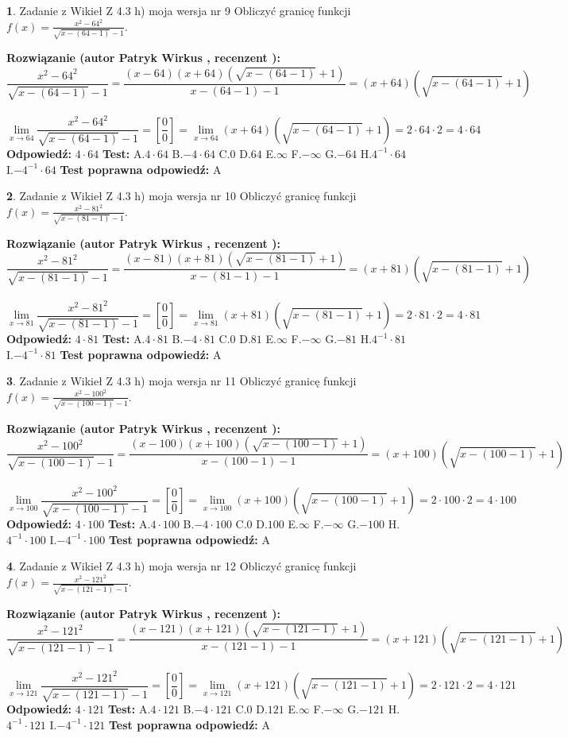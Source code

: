 \documentclass[12pt, a4paper]{article}
\theoremstyle{definition} %
\newtheorem{zad}{}
\newcommand{\zadStart}[1]{\begin{zad}#1\newline}
\newcommand{\zadStop}{\end{zad}}
\newcommand{\rozwStart}[2]{\noindent \textbf{Rozwiązanie (autor #1 , recenzent #2): }\newline}
\newcommand{\rozwStop}{\newline}
\newcommand{\odpStart}{\noindent \textbf{Odpowiedź:}\newline}
\newcommand{\odpStop}{\newline}
\newcommand{\testStart}{\noindent \textbf{Test:}\newline}
\newcommand{\testStop}{\newline}
\newcommand{\kluczStart}{\noindent \textbf{Test poprawna odpowiedź:}\newline}
\newcommand{\kluczStop}{\newline}
\begin{document}
\zadStart{Zadanie z Wikieł Z 4.3 h) moja wersja nr 9}
Obliczyć granicę funkcji $f(x)=\frac{x^{2} - 64^{2}}{\sqrt{x-(64-1)}-1}$.
\zadStop
\rozwStart{Patryk Wirkus}{}
$$\frac{x^{2} - 64^{2}}{\sqrt{x-(64-1)}-1}=\frac{(x-64)(x+64)(\sqrt{x-(64-1)}+1)}{x-(64-1)-1}=(x+64)(\sqrt{x-(64-1)}+1)$$
\\
$$\lim\limits_{x\to 64}\frac{x^{2} - 64^{2}}{\sqrt{x-(64-1)}-1}=[\frac{0}{0}]=
\lim\limits_{x\to 64}(x+64)(\sqrt{x-(64-1)}+1) = 2\cdot64 \cdot 2 = 4 \cdot 64$$
\rozwStop
\odpStart
$4\cdot64$
\odpStop
\testStart
A.$4\cdot64$
B.$-4\cdot64$
C.$0$
D.$64$
E.$\infty$
F.$-\infty$
G.$-64$
H.$4^{-1}\cdot64$
I.$-4^{-1}\cdot64$
\testStop
\kluczStart
A
\kluczStop



\zadStart{Zadanie z Wikieł Z 4.3 h) moja wersja nr 10}
Obliczyć granicę funkcji $f(x)=\frac{x^{2} - 81^{2}}{\sqrt{x-(81-1)}-1}$.
\zadStop
\rozwStart{Patryk Wirkus}{}
$$\frac{x^{2} - 81^{2}}{\sqrt{x-(81-1)}-1}=\frac{(x-81)(x+81)(\sqrt{x-(81-1)}+1)}{x-(81-1)-1}=(x+81)(\sqrt{x-(81-1)}+1)$$
\\
$$\lim\limits_{x\to 81}\frac{x^{2} - 81^{2}}{\sqrt{x-(81-1)}-1}=[\frac{0}{0}]=
\lim\limits_{x\to 81}(x+81)(\sqrt{x-(81-1)}+1) = 2\cdot81 \cdot 2 = 4 \cdot 81$$
\rozwStop
\odpStart
$4\cdot81$
\odpStop
\testStart
A.$4\cdot81$
B.$-4\cdot81$
C.$0$
D.$81$
E.$\infty$
F.$-\infty$
G.$-81$
H.$4^{-1}\cdot81$
I.$-4^{-1}\cdot81$
\testStop
\kluczStart
A
\kluczStop



\zadStart{Zadanie z Wikieł Z 4.3 h) moja wersja nr 11}
Obliczyć granicę funkcji $f(x)=\frac{x^{2} - 100^{2}}{\sqrt{x-(100-1)}-1}$.
\zadStop
\rozwStart{Patryk Wirkus}{}
$$\frac{x^{2} - 100^{2}}{\sqrt{x-(100-1)}-1}=\frac{(x-100)(x+100)(\sqrt{x-(100-1)}+1)}{x-(100-1)-1}=(x+100)(\sqrt{x-(100-1)}+1)$$
\\
$$\lim\limits_{x\to 100}\frac{x^{2} - 100^{2}}{\sqrt{x-(100-1)}-1}=[\frac{0}{0}]=
\lim\limits_{x\to 100}(x+100)(\sqrt{x-(100-1)}+1) = 2\cdot100 \cdot 2 = 4 \cdot 100$$
\rozwStop
\odpStart
$4\cdot100$
\odpStop
\testStart
A.$4\cdot100$
B.$-4\cdot100$
C.$0$
D.$100$
E.$\infty$
F.$-\infty$
G.$-100$
H.$4^{-1}\cdot100$
I.$-4^{-1}\cdot100$
\testStop
\kluczStart
A
\kluczStop



\zadStart{Zadanie z Wikieł Z 4.3 h) moja wersja nr 12}
Obliczyć granicę funkcji $f(x)=\frac{x^{2} - 121^{2}}{\sqrt{x-(121-1)}-1}$.
\zadStop
\rozwStart{Patryk Wirkus}{}
$$\frac{x^{2} - 121^{2}}{\sqrt{x-(121-1)}-1}=\frac{(x-121)(x+121)(\sqrt{x-(121-1)}+1)}{x-(121-1)-1}=(x+121)(\sqrt{x-(121-1)}+1)$$
\\
$$\lim\limits_{x\to 121}\frac{x^{2} - 121^{2}}{\sqrt{x-(121-1)}-1}=[\frac{0}{0}]=
\lim\limits_{x\to 121}(x+121)(\sqrt{x-(121-1)}+1) = 2\cdot121 \cdot 2 = 4 \cdot 121$$
\rozwStop
\odpStart
$4\cdot121$
\odpStop
\testStart
A.$4\cdot121$
B.$-4\cdot121$
C.$0$
D.$121$
E.$\infty$
F.$-\infty$
G.$-121$
H.$4^{-1}\cdot121$
I.$-4^{-1}\cdot121$
\testStop
\kluczStart
A
\kluczStop
\end{document}
